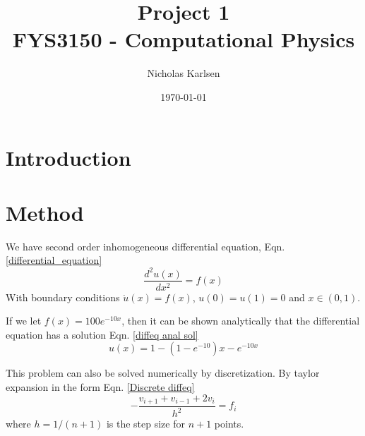 \documentclass[11pt,a4paper, twocolumn]{article}
\begin{document}
\title{Project 1\\
\normalsize{FYS3150 - Computational Physics}\\}

\author{Nicholas Karlsen}


\date{\today}%



\section{Introduction \label{sect:intro}}

\section{Method \label{sect:method}}

  We have second order inhomogeneous differential equation, Eqn. \ref{differential_equation}
  \begin{equation}
    \label{differential_equation}
    \frac{d^2u(x)}{dx^2} = f(x)
  \end{equation}
  With boundary conditions $\ddot{u}(x) = f(x)$, $u(0) = u(1) = 0$ and $x \in (0, 1)$.

  If we let $f(x) = 100e^{-10x}$, then it can be shown analytically that the differential equation has a solution Eqn. \ref{diffeq anal sol}
  \begin{equation}
    \label{diffeq anal sol}
    u(x) = 1 - (1 - e^{-10})x - e^{-10x}
  \end{equation}

  This problem can also be solved numerically by discretization. By taylor expansion in the form Eqn. \ref{Discrete diffeq}
  \begin{equation}
    \label{Discrete diffeq}
    - \frac{v_{i+1} + v_{i-1} + 2v_i}{h^2} = f_i
  \end{equation}
  where $h = 1/(n+1)$ is the step size for $n+1$ points.
\end{document}
